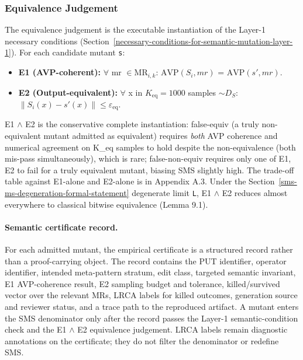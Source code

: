 \documentclass[12pt]{article}
\providecommand{\tightlist}{\setlength{\itemsep}{0pt}\setlength{\parskip}{0pt}}
\begin{document}
\subsubsection{Equivalence Judgement}\label{equivalence-judgement-e1-e2-layer-2}

The equivalence judgement is the executable instantiation of the Layer-1
necessary conditions (Section~\ref{necessary-conditions-for-semantic-mutation-layer-1}). For each candidate mutant
\texttt{s\textquotesingle{}}:

\begin{itemize}
\tightlist
\item
  \textbf{E1 (AVP-coherent):} $\forall$ mr $\in \mathrm{MR}_{i,k}$: $\mathrm{AVP}(S_i, mr)$ =
  $\mathrm{AVP}(s', mr)$.
\item
  \textbf{E2 (Output-equivalent):} $\forall$ x in $K_{\mathrm{eq}}=1000$ samples
  $\sim D_S$: $\|S_i(x) - s'(x)\| \leq \varepsilon_{\mathrm{eq}}$.
\end{itemize}

E1 $\wedge$ E2 is the conservative complete instantiation: false-equiv (a
truly non-equivalent mutant admitted as equivalent) requires \emph{both}
AVP coherence and numerical agreement on K\_eq samples to hold despite the
non-equivalence (both mis-pass simultaneously), which is rare;
false-non-equiv requires only one of E1, E2 to fail for a truly equivalent
mutant, biasing SMS slightly high. The trade-off table against
E1-alone and E2-alone is in Appendix A.3. Under the Section~\ref{sms-ms-degeneration-formal-statement} degenerate
limit \texttt{L}, E1 $\wedge$ E2 reduces almost everywhere to classical bitwise
equivalence (Lemma 9.1).

\paragraph{Semantic certificate record.}
For each admitted mutant, the empirical certificate is a structured
record rather than a proof-carrying object. The record contains the PUT
identifier, operator identifier, intended meta-pattern stratum, edit
class, targeted semantic invariant, E1 AVP-coherence result, E2 sampling
budget and tolerance, killed/survived vector over the relevant MRs, LRCA
labels for killed outcomes, generation source and reviewer status, and a
trace path to the reproduced artifact. A mutant enters the SMS
denominator only after the record passes the Layer-1 semantic-condition
check and the E1 $\wedge$ E2 equivalence judgement. LRCA labels remain
diagnostic annotations on the certificate; they do not filter the
denominator or redefine SMS.
\end{document}
